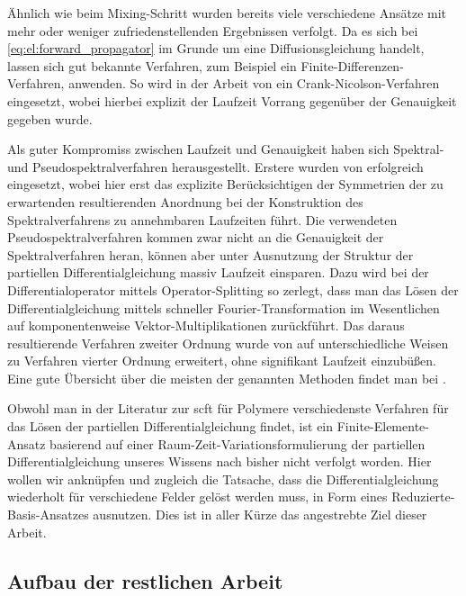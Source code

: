 Ähnlich wie beim Mixing-Schritt wurden bereits viele verschiedene Ansätze mit mehr oder weniger zufriedenstellenden Ergebnissen verfolgt.
Da es sich bei \cref{eq:el:forward_propagator} im Grunde um eine Diffusionsgleichung handelt, lassen sich gut bekannte Verfahren, zum Beispiel ein Finite-Differenzen-Verfahren, anwenden.
So wird in der Arbeit von \textcite{Drolet:1999bs} ein Crank-Nicolson-Verfahren eingesetzt, wobei hierbei explizit der Laufzeit Vorrang gegenüber der Genauigkeit gegeben wurde.

Als guter Kompromiss zwischen Laufzeit und Genauigkeit haben sich Spektral- und Pseudospektralverfahren herausgestellt.
Erstere wurden von \textcite{Matsen:1994bz} erfolgreich eingesetzt, wobei hier erst das explizite Berücksichtigen der Symmetrien der zu erwartenden resultierenden Anordnung bei der Konstruktion des Spektralverfahrens zu annehmbaren Laufzeiten führt.
Die verwendeten Pseudospektralverfahren kommen zwar nicht an die Genauigkeit der Spektralverfahren heran, können aber unter Ausnutzung der Struktur der partiellen Differentialgleichung massiv Laufzeit einsparen.
Dazu wird bei \textcite{Rasmussen:2002kt} der Differentialoperator mittels Operator-Splitting so zerlegt, dass man das Lösen der Differentialgleichung mittels schneller Fourier-Transformation im Wesentlichen auf komponentenweise Vektor-Multiplikationen zurückführt.
Das daraus resultierende Verfahren zweiter Ordnung wurde von \textcite{GarciaCervera:2006uu,Ranjan:2007kl} auf unterschiedliche Weisen zu Verfahren vierter Ordnung erweitert, ohne signifikant Laufzeit einzubüßen.
Eine gute Übersicht über die meisten der genannten Methoden findet man bei \textcites[Section 3.6]{Fredrickson:2006th}{Audus:2013ep}.

Obwohl man in der Literatur zur \ac{scft} für Polymere verschiedenste Verfahren für das Lösen der partiellen Differentialgleichung findet, ist ein Finite-Elemente-Ansatz basierend auf einer Raum-Zeit-Variationsformulierung der partiellen Differentialgleichung unseres Wissens nach bisher nicht verfolgt worden.
Hier wollen wir anknüpfen und zugleich die Tatsache, dass die Differentialgleichung wiederholt für verschiedene Felder gelöst werden muss, in Form eines Reduzierte-Basis-Ansatzes ausnutzen.
Dies ist in aller Kürze das angestrebte Ziel dieser Arbeit.


\subsection*{Aufbau der restlichen Arbeit}


